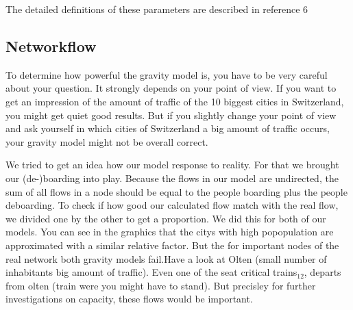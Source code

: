 \documentclass[11pt]{article}
\begin{document}
The detailed definitions of these parameters are described in reference 6 


\subsection{Networkflow}

To determine how powerful the gravity model is, you have to be very careful about your question. It strongly depends on your point of view. If you want to get an impression of the amount of traffic of the 10 biggest cities in Switzerland, you might get quiet good results. But if you slightly change your point of view and ask yourself in which cities of Switzerland a big amount of traffic occurs, your gravity model might not be overall correct. 

We tried to get an idea how our model response to reality. For that we brought our (de-)boarding into play. Because the flows in our model are undirected, the sum of all flows in a node should be equal to the people boarding plus the people deboarding. To check if how good our calculated flow match with the real flow, we divided one by the other to get a proportion. We did this for both of our models. You can see in the graphics that the citys with high popopulation are approximated with a similar relative factor. But the for important nodes of the real network both gravity models fail.Have a look at Olten (small number of inhabitants big amount of traffic). Even one of the seat critical trains$_{12}$, departs from olten (train were you might have to stand). But precisley for further investigations on capacity, these flows would be important.
\end{document}
